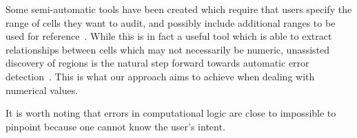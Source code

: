 Some semi-automatic tools have been created which require that users
specify the range of cells they want to audit, and possibly include
additional ranges to be used for reference~\cite{FIXME}. %
 While this is in fact
a useful tool which is able to extract relationships between cells
which may not necessarily be numeric, unassisted discovery of regions
is the natural step forward towards automatic error detection~\cite{fisher2006scaling}. %
This is what our approach aims to achieve when dealing with
numerical values.

It is worth noting that errors in computational logic are close to
impossible to pinpoint because one cannot know the user's intent.
